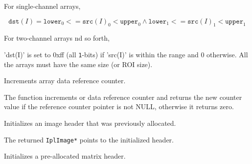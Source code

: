 For single-channel arrays,

\[
\texttt{dst}(I)=
\texttt{lower}_0 <= \texttt{src}(I)_0 < \texttt{upper}_0 \land
\texttt{lower}_1 <= \texttt{src}(I)_1 < \texttt{upper}_1
\]

For two-channel arrays nd so forth,

'dst(I)' is set to 0xff (all \texttt{1}-bits) if 'src(I)' is within the range and 0 otherwise. All the arrays must have the same size (or ROI size).

\ifC
{}
Increments array data reference counter.


\begin{description}
\end{description}

The function increments  or
 data reference counter and returns the new counter value
if the reference counter pointer is not NULL, otherwise it returns zero.

Initializes an image header that was previously allocated.


\begin{description}
\end{description}

The returned \texttt{IplImage*} points to the initialized header.

Initializes a pre-allocated matrix header.


